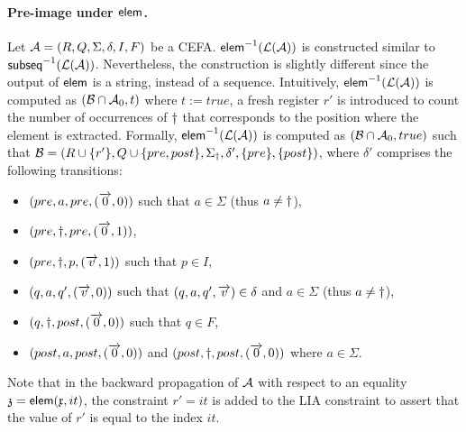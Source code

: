 



\paragraph*{Pre-image under ${\sf elem}$.}
Let $\mathcal{A} = (R, Q, \Sigma, \delta, I, F)$ be a CEFA. 
${\sf elem}^{-1}(\mathcal{L}(\mathcal{A}))$ is constructed similar to ${\sf subseq}^{-1}(\mathcal{L}(\mathcal{A}))$. Nevertheless, the construction is slightly different since the output of ${\sf elem}$ is a string, instead of a sequence. Intuitively, ${\sf elem}^{-1}(\mathcal{L}(\mathcal{A}))$ is computed as $(\mathcal{B} \cap \mathcal{A}_0,t)$ where $t := true$, a fresh register $r'$ is introduced to count the number of occurrences of $\dag$ that corresponds to the position where the element is extracted. Formally, ${\sf elem}^{-1}(\mathcal{L}(\mathcal{A}))$ is computed as $(\mathcal{B} \cap \mathcal{A}_0, true)$ such that $\mathcal{B} = (R \cup \{r'\}, Q \cup \{pre, post\}, \Sigma_{\dag}, \delta', \{pre\}, \{post\})$, where $\delta'$ comprises the following transitions: 
\begin{itemize}[topsep=0pt,partopsep=0pt]
\item $(pre, a, pre, (\overrightarrow{0}, 0))$ such that $a \in \Sigma$ (thus $a \neq \dag$),  
%
\item $(pre, \dag, pre, (\overrightarrow{0}, 1))$,
%
\item $(pre, \dag, p, (\overrightarrow{v}, 1))$ such that $p \in I$, 
%
\item $(q, a, q', (\overrightarrow{v}, 0))$ such that $(q, a, q', \overrightarrow{v}) \in \delta$ and $a \in \Sigma$ (thus $a \neq \dag$), 
%
\item $(q, \dag, post, (\overrightarrow{0}, 0))$ such that $q \in F$,
%
\item $(post, a, post, (\overrightarrow{0}, 0))$ and $(post, \dag, post, (\overrightarrow{0}, 0))$ where $a \in \Sigma$.
\end{itemize}
Note that in the backward propagation of $\mathcal{A}$ with respect to an equality $\mathfrak{z} = {\sf elem}(\mathfrak{x}, it)$, the constraint $r' = it$ is added to the LIA constraint to assert that the value of $r'$ is equal to the index $it$.

